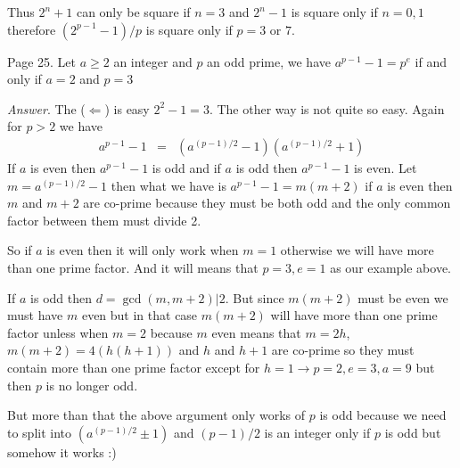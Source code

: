 \documentclass[aps,preprint,preprintnumbers,nofootinbib,showpacs,prd]{revtex4-1}
\newcommand{\nbea}{\begin{eqnarray*}}
\newcommand{\neea}{\end{eqnarray*}}
\begin{document}
Thus $2^n + 1$ can only be square if $n = 3$ and $2^n - 1$ is square only if $n = 0, 1$ therefore $(2^{p-1} - 1)/p$ is square only if $p = 3$ or $7$.

Page 25. Let $a \ge 2$ an integer and $p$ an odd prime, we have $a^{p-1} - 1 = p^e$ if and only if $a = 2$ and $p = 3$

{\it Answer}. The ($\Leftarrow$) is easy $2^2 - 1 = 3$. The other way is not quite so easy. Again for $p > 2$ we have 
%
\nbea
a^{p-1} - 1 & = & (a^{(p-1)/2} - 1)(a^{(p-1)/2} + 1)
\neea
%
If $a$ is even then $a^{p-1} - 1$ is odd and if $a$ is odd then $a^{p-1} - 1$ is even. Let $m = a^{(p-1)/2} - 1$ then what we have is $a^{p-1} - 1 = m(m+2)$ if $a$ is even then $m$ and $m + 2$ are co-prime because they must be both odd and the only common factor between them must divide 2. 

So if $a$ is even then it will only work when $m = 1$ otherwise we will have more than one prime factor. And it will means that $p=3, e=1$ as our example above.

If $a$ is odd then $d = \gcd(m, m+2) | 2$. But since $m(m+2)$ must be even we must have $m$ even but in that case $m(m + 2)$ will have more than one prime factor unless when $m = 2$ because $m$ even means that $m=2h$, $m(m + 2) = 4(h(h + 1))$ and $h$ and $h + 1$ are co-prime so they must contain more than one prime factor except for $h = 1 \to p = 2, e = 3, a = 9$ but then $p$ is no longer odd.

But more than that the above argument only works of $p$ is odd because we need to split into $(a^{(p-1)/2} \pm 1)$ and $(p-1)/2$ is an integer only if $p$ is odd but somehow it works :) 
\end{document}
